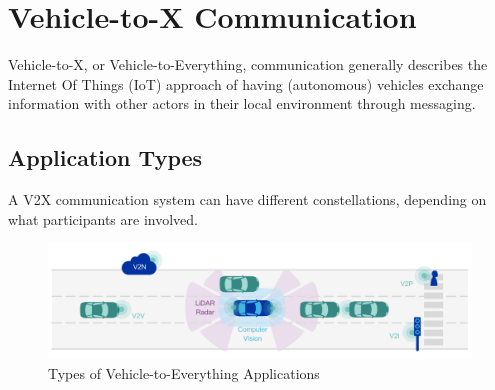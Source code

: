 \section{Vehicle-to-X Communication}
\label{sec:background:v2x_communication}
Vehicle-to-X, or Vehicle-to-Everything, communication generally describes the Internet Of Things (IoT) approach of having (autonomous) vehicles exchange information with other actors in their local environment through messaging.

\subsection{Application Types}
\label{subsec:background:application_types}
A V2X communication system can have different constellations, depending on what participants are involved.

\begin{figure}[H]
	\centering
	\includegraphics[width=1.0\textwidth]{98_images/v2x_types.png}
	\caption[Types of Vehicle-to-Everything Applications]{Types of Vehicle-to-Everything Applications \cite{5GAutomotiveAssociation2016}}
	\label{fig:v2x_types}
\end{figure}

